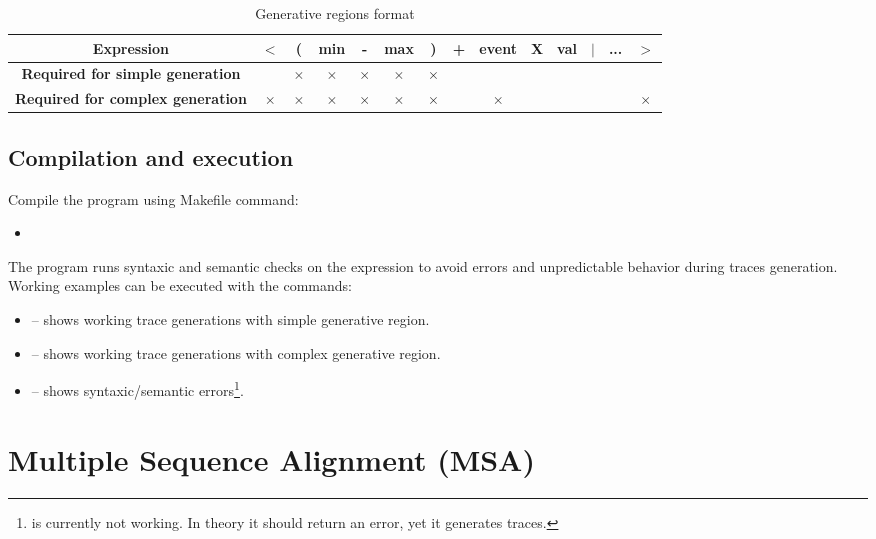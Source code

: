 \documentclass[12pt,a4paper]{article}
\begin{document}
\begin{table}[H]
	\begin{center}
		\caption{Generative regions format}
		\begin{tabular}{|c|c|c|c|c|c|c|c|c|c|c|c|c|c|}
			\hline
			\textbf{Expression} & $<$ & ( & min & - & max & ) & + & event & X & val & $|$ & ... & $>$ \\
			\hline
			\textbf{Required for simple generation} && $\times$ & $\times$ & $\times$ & $\times$ & $\times$ &&&&&&& \\
			\hline
			\textbf{Required for complex generation} & $\times$ & $\times$ & $\times$ & $\times$ & $\times$ & $\times$ && $\times$ &&&&& $\times$ \\
			\hline
		\end{tabular}
	\end{center}
\end{table}

\subsection{Compilation and execution}

Compile the program using Makefile command:
\begin{itemize}
	\item {}
\end{itemize}

The program runs syntaxic and semantic checks on the expression to avoid errors and unpredictable behavior during traces generation. Working examples can be executed with the commands:
\begin{itemize}
	\item {} -- shows working trace generations with simple generative region.
	\item {} -- shows working trace generations with complex generative region.
	\item {} -- shows syntaxic/semantic errors\footnote{{\selectfont{make test\_semantic4}} is currently not working. In theory it should return an error, yet it generates traces.}.
\end{itemize}

\section{Multiple Sequence Alignment (MSA)}
\end{document}
